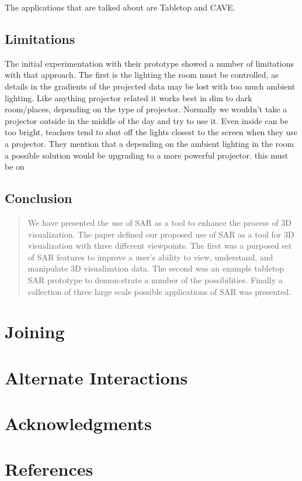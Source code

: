 \documentclass{sig-alternate}
\begin{document}
The applications that are talked about are Tabletop and CAVE.


\subsection{Limitations}
\label{sec:Limitations}

The initial experimentation with their prototype showed a number of limitations with that approach. The first is the lighting the room must be controlled, as details in the gradients of the projected data may be lost with too much ambient lighting. Like anything projector related it works best in dim to dark room/places, depending on the type of projector. Normally we wouldn't take a projector outside in the middle of the day and try to use it. Even inside can be too bright, teachers tend to shut off the lights closest to the screen when they use a projector. They mention that a depending on the ambient lighting in the room a possible solution would be upgrading to a more powerful projector. this must be on    

\subsection{Conclusion}
\label{sec:Conclusion}

\begin{quote}
We have presented the use of SAR as a tool to enhance the process of 3D visualization. The paper defined our proposed use of SAR as a tool for 3D visualization with three different viewpoints. The first was a purposed set of SAR features to improve a user's ability to view, understand, and manipulate 3D visualization data. The second was an example tabletop SAR prototype to demon-strate a number of the possibilities. Finally a collection of three large scale possible applications of SAR was presented.
\end{quote}


\section{Joining}
\label{sec:Joining}

\section{Alternate Interactions}
\label{sec:Alternate Interactions}

\section{Acknowledgments}
\label{sec:Acknowledgments}

\section{References}
\label{sec:References}
\end{document}

